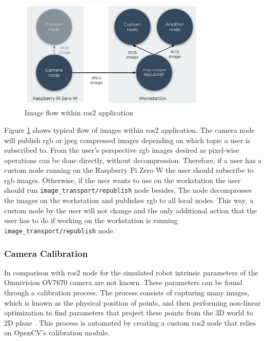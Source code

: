 \begin{figure}[H]
    \centering
    \includegraphics[width=0.8\textwidth]{physical/figures/camera_ros_images.pdf}
    \caption{Image flow within \ac{ros2} application}
    \label{fig:physical:camera_ros_images}
\end{figure}

Figure \ref{fig:physical:camera_ros_images} shows typical flow of images within \ac{ros2} application.
The camera node will publish \acs{rgb} or \acs{jpeg} compressed images depending on which topic a user is subscribed to.
From the user's perspective \ac{rgb} images desired as pixel-wise operations can be done directly, without decompression.
Therefore, if a user has a custom node running on the Raspberry Pi Zero W the user should subscribe to \ac{rgb} images.
Otherwise, if the user wants to use on the workstation the user should run \texttt{image\_transport/republish} node besides.
The node decompresses the images on the workstation and publishes \ac{rgb} to all local nodes.
This way, a custom node by the user will not change and the only additional action that the user has to do if working on the workstation is running \texttt{image\_transport/republish} node.
 
\subsubsection{Camera Calibration}
In comparison with \ac{ros2} node for the simulated robot intrinsic parameters of the Omnivision OV7670 camera are not known.
These parameters can be found through a calibration process. The process consists of capturing many images, which is known as the physical position of points, and then performing non-linear optimization to find parameters that project these points from the 3D world to 2D plane \cite{lukic_dual_nodate}. This process is automated by creating a custom \ac{ros2} node that relies on OpenCV's calibration module.

